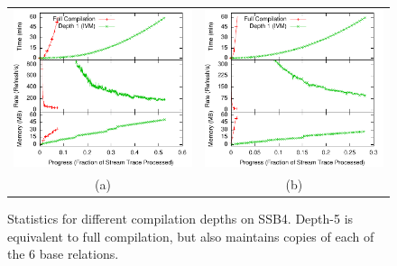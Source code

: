\begin{figure}
\begin{center}
\vspace*{0.1in}

\begin{minipage}{\textwidth}
\begin{center}
\begin{tabular}{cc}
\includegraphics[width=\figurewidth]{../graphs/graphs/unified_axfinder.pdf} &
\includegraphics[width=\figurewidth]{../graphs/graphs/unified_brokerspread.pdf} \\
(a) & (b)
\end{tabular}
\caption{Performance comparison on AXFINDER (a) and BROKERSPREAD (b).  Full compilation's aggressive materialization strategy results in the caches growing too large to be efficiently maintained.}
\label{fig:experiments:axfinder}
\label{fig:experiments:brokerspread}
\end{center}
\end{minipage}

\vspace*{0.1in}

\begin{minipage}{\textwidth}
\begin{center}

\caption{Statistics for different compilation depths on SSB4.  Depth-5 is equivalent to full compilation, but also maintains copies of each of the 6 base relations.}
\end{center}
\end{minipage}

\end{center}
\end{figure}

